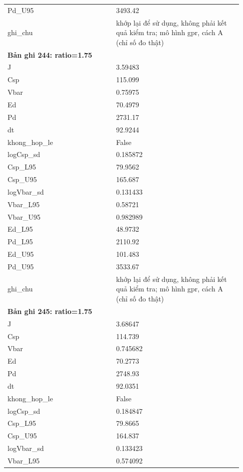 \begin{longtable}{p{0.43\linewidth}p{0.50\linewidth}}
Pd\_\allowbreak U95 & 3493.42 \\
ghi\_\allowbreak chu & khớp lại để sử dụng, không phải kết quả kiểm tra; mô hình gpr, cách A (chỉ số đo thật) \\
\midrule
\multicolumn{2}{p{0.95\linewidth}}{\textbf{Bản ghi 244: ratio=1.75}} \\
J & 3.59483 \\
Csp & 115.099 \\
Vbar & 0.75975 \\
Ed & 70.4979 \\
Pd & 2731.17 \\
dt & 92.9244 \\
khong\_\allowbreak hop\_\allowbreak le & False \\
logCsp\_\allowbreak sd & 0.185872 \\
Csp\_\allowbreak L95 & 79.9562 \\
Csp\_\allowbreak U95 & 165.687 \\
logVbar\_\allowbreak sd & 0.131433 \\
Vbar\_\allowbreak L95 & 0.58721 \\
Vbar\_\allowbreak U95 & 0.982989 \\
Ed\_\allowbreak L95 & 48.9732 \\
Pd\_\allowbreak L95 & 2110.92 \\
Ed\_\allowbreak U95 & 101.483 \\
Pd\_\allowbreak U95 & 3533.67 \\
ghi\_\allowbreak chu & khớp lại để sử dụng, không phải kết quả kiểm tra; mô hình gpr, cách A (chỉ số đo thật) \\
\midrule
\multicolumn{2}{p{0.95\linewidth}}{\textbf{Bản ghi 245: ratio=1.75}} \\
J & 3.68647 \\
Csp & 114.739 \\
Vbar & 0.745682 \\
Ed & 70.2773 \\
Pd & 2748.93 \\
dt & 92.0351 \\
khong\_\allowbreak hop\_\allowbreak le & False \\
logCsp\_\allowbreak sd & 0.184847 \\
Csp\_\allowbreak L95 & 79.8665 \\
Csp\_\allowbreak U95 & 164.837 \\
logVbar\_\allowbreak sd & 0.133423 \\
Vbar\_\allowbreak L95 & 0.574092 \\

\end{longtable}
